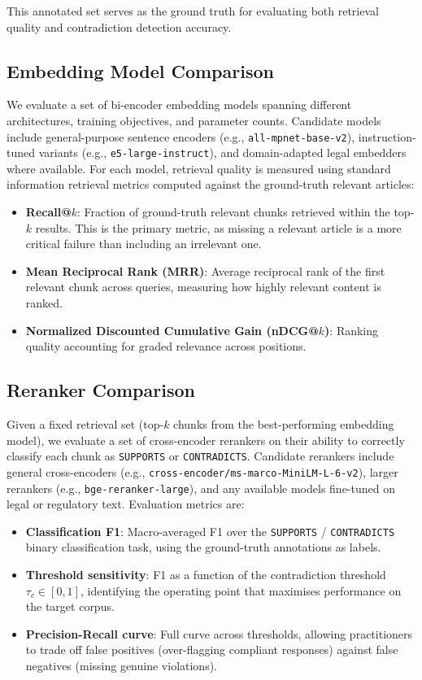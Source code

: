 \documentclass[11pt]{article}
\begin{document}
This annotated set serves as the ground truth for evaluating both retrieval quality and contradiction detection accuracy.

\subsection{Embedding Model Comparison}

We evaluate a set of bi-encoder embedding models spanning different architectures, training objectives, and parameter counts. Candidate models include general-purpose sentence encoders (e.g., \texttt{all-mpnet-base-v2}), instruction-tuned variants (e.g., \texttt{e5-large-instruct}), and domain-adapted legal embedders where available. For each model, retrieval quality is measured using standard information retrieval metrics computed against the ground-truth relevant articles:

\begin{itemize}
    \item \textbf{Recall@$k$}: Fraction of ground-truth relevant chunks retrieved within the top-$k$ results. This is the primary metric, as missing a relevant article is a more critical failure than including an irrelevant one.
    \item \textbf{Mean Reciprocal Rank (MRR)}: Average reciprocal rank of the first relevant chunk across queries, measuring how highly relevant content is ranked.
    \item \textbf{Normalized Discounted Cumulative Gain (nDCG@$k$)}: Ranking quality accounting for graded relevance across positions.
\end{itemize}

\subsection{Reranker Comparison}

Given a fixed retrieval set (top-$k$ chunks from the best-performing embedding model), we evaluate a set of cross-encoder rerankers on their ability to correctly classify each chunk as \texttt{SUPPORTS} or \texttt{CONTRADICTS}. Candidate rerankers include general cross-encoders (e.g., \texttt{cross-encoder/ms-marco-MiniLM-L-6-v2}), larger rerankers (e.g., \texttt{bge-reranker-large}), and any available models fine-tuned on legal or regulatory text. Evaluation metrics are:

\begin{itemize}
    \item \textbf{Classification F1}: Macro-averaged F1 over the \texttt{SUPPORTS} / \texttt{CONTRADICTS} binary classification task, using the ground-truth annotations as labels.
    \item \textbf{Threshold sensitivity}: F1 as a function of the contradiction threshold $\tau_c \in [0, 1]$, identifying the operating point that maximises performance on the target corpus.
    \item \textbf{Precision-Recall curve}: Full curve across thresholds, allowing practitioners to trade off false positives (over-flagging compliant responses) against false negatives (missing genuine violations).
\end{itemize}
\end{document}
